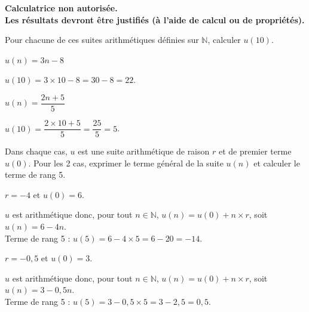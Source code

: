 \documentclass[11pt,a4paper]{article}  %
\begin{document}
	\graphicspath{{images/}}

	\begin{center}
	\end{center}

\begin{center}\textbf{Calculatrice non autorisée.\\Les résultats devront être justifiés (à l'aide de calcul ou de propriétés).}\end{center}


\exerciceDS{}
Pour chacune de ces suites arithmétiques définies sur $\mathbb{N}$, calculer $u(10)$.
\begin{enumMet}
	\item {} $u(n)=3 n-8$
	\par
	\begin{corrBox}
		$u(10)=3\times 10-8=30-8=22$.
	\end{corrBox}

	\item $u(n)=\dfrac{2 n+5}{5}$
	\par
	\begin{corrBox}
		$u(10)=\dfrac{2\times 10+5}{5}=\dfrac{25}{5}=5$.
	\end{corrBox}
\end{enumMet}


\exerciceDS{}
Dans chaque cas, $u$ est une suite arithmétique de raison $r$ et de premier terme $u(0)$. Pour les 2 cas, exprimer le terme général de la suite $u(n)$ et calculer le terme de rang 5.
\begin{enumMet}
	\item $r=-4$ et $u(0)=6$.
	\par
	\begin{corrBox}
		$u$ est arithmétique donc, pour tout $n\in\mathbb{N}$, $u(n)=u(0)+n\times r$, soit $u(n)=6-4n$.\\
		Terme de rang 5 : $u(5)=6-4\times 5=6-20=-14$.
	\end{corrBox}

	\item {} $r=-0,5$ et $u(0)=3$.
	\par
	\begin{corrBox}
		$u$ est arithmétique donc, pour tout $n\in\mathbb{N}$, $u(n)=u(0)+n\times r$, soit $u(n)=3-0,5n$.\\
		Terme de rang 5 : $u(5)=3-0,5\times 5=3-2,5=0,5$.
	\end{corrBox}
\end{enumMet}
\end{document}
